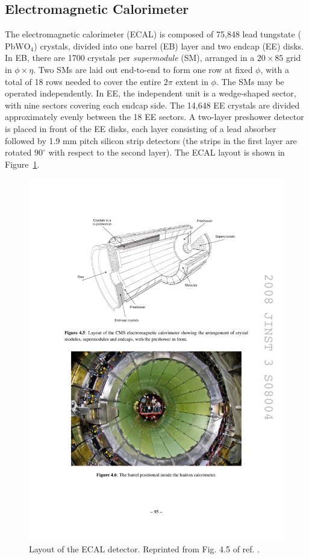 \documentclass[dissertation.tex]{subfiles}
\begin{document}
\subsection{Electromagnetic Calorimeter}
\label{sec:Electromagnetic Calorimeter}

The electromagnetic calorimeter (ECAL) is composed of 75,848 lead tungstate ($\mbox{PbWO}_{4}$) crystals, divided into one barrel (EB) layer and two endcap (EE) disks.  In EB, there are 1700 crystals per \textit{supermodule} (SM), arranged in a $20\times85$ grid in $\phi\times\eta$.  Two SMs are laid out end-to-end to form one row at fixed $\phi$, with a total of 18 rows needed to cover the entire $2\pi$ extent in $\phi$.  The SMs may be operated independently.  In EE, the independent unit is a wedge-shaped sector, with nine sectors covering each endcap side.  The 14,648 EE crystals are divided approximately evenly between the 18 EE sectors.  A two-layer preshower detector is placed in front of the EE disks, each layer consisting of a lead absorber followed by 1.9 mm pitch silicon strip detectors (the strips in the first layer are rotated $90^{\circ}$ with respect to the second layer).  The ECAL layout is shown in Figure~\ref{fig:ECAL_layout}.

\begin{figure}
	\centering
	\includegraphics[scale=1.0]{ECAL_layout}
	\caption{Layout of the ECAL detector.  Reprinted from Fig. 4.5 of ref. \cite{1748-0221-3-08-S08004}.}
	\label{fig:ECAL_layout}
\end{figure}
\end{document}
